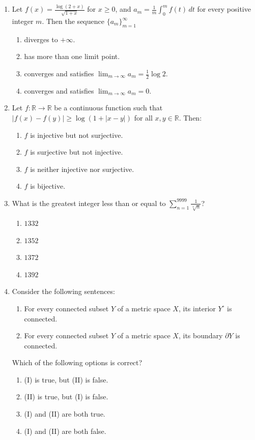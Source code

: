 \documentclass[11pt, a4paper]{article}
\begin{document}
\begin{enumerate}
  \item Let $f(x) = \frac{\log(2+x)}{\sqrt{1+x}}$ for $x \ge 0$, and $a_m = \frac{1}{m} \int_0^m f(t)\,dt$ for every positive integer $m$. Then the sequence $\{a_m\}_{m=1}^\infty$
  \begin{enumerate}[label=(\alph*)]
    \item diverges to $+\infty$.
    \item has more than one limit point.
    \item converges and satisfies $\lim_{m \to \infty} a_m = \frac{1}{2} \log 2$.
    \item converges and satisfies $\lim_{m \to \infty} a_m = 0$.
  \end{enumerate}

  \item Let $f: \mathbb{R} \to \mathbb{R}$ be a continuous function such that $|f(x) - f(y)| \ge \log(1 + |x - y|)$ for all $x, y \in \mathbb{R}$. Then:
  \begin{enumerate}[label=(\alph*)]
    \item $f$ is injective but not surjective.
    \item $f$ is surjective but not injective.
    \item $f$ is neither injective nor surjective.
    \item $f$ is bijective.
  \end{enumerate}

  \item What is the greatest integer less than or equal to $\displaystyle \sum_{n=1}^{9999} \frac{1}{\sqrt[4]{n}}$?
  \begin{enumerate}[label=(\alph*)]
    \item $1332$
    \item $1352$
    \item $1372$
    \item $1392$
  \end{enumerate}

  \item Consider the following sentences:
  \begin{enumerate}[label=(\Roman*)]
    \item For every connected subset $Y$ of a metric space $X$, its interior $Y^\circ$ is connected.
    \item For every connected subset $Y$ of a metric space $X$, its boundary $\partial Y$ is connected.
  \end{enumerate}
  Which of the following options is correct?
  \begin{enumerate}[label=(\alph*)]
    \item (I) is true, but (II) is false.
    \item (II) is true, but (I) is false.
    \item (I) and (II) are both true.
    \item (I) and (II) are both false.
  \end{enumerate}


\end{enumerate}
\end{document}
